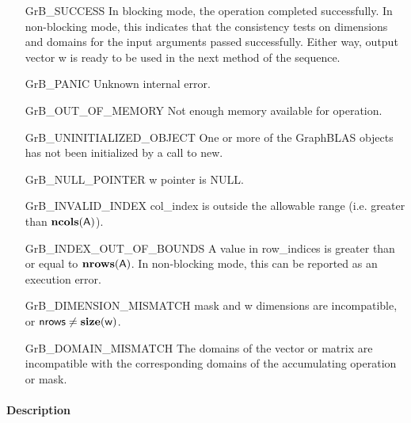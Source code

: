 \begin{itemize}[leftmargin=2.1in]
    \item[{\sf GrB\_SUCCESS}]         In blocking mode, the operation completed
    successfully. In non-blocking mode, this indicates that the consistency 
    tests on dimensions and domains for the input arguments passed successfully. 
    Either way, output vector {\sf w} is ready to be used in the next method of 
    the sequence.

    \item[{\sf GrB\_PANIC}]            Unknown internal error.
    
    \item[{\sf GrB\_OUT\_OF\_MEMORY}]  Not enough memory available for operation.
    
    \item[{\sf GrB\_UNINITIALIZED\_OBJECT}]  One or more of the GraphBLAS 
    objects has not been initialized by a call to {\sf new}.

    \item[{\sf GrB\_NULL\_POINTER}]    {\sf w} pointer is NULL.  
    
    \item[{\sf GrB\_INVALID\_INDEX}]    {\sf col\_index} is outside the allowable 
    range (i.e. greater than $\bold{ncols}({\sf A})$).

    \item[{\sf GrB\_INDEX\_OUT\_OF\_BOUNDS}]  A value in {\sf row\_indices} 
    is greater than or equal to $\bold{nrows}({\sf A})$.  In 
    non-blocking mode, this can be reported as an execution error.
    
    \item[{\sf GrB\_DIMENSION\_MISMATCH}] {\sf mask} and {\sf w} dimensions are
    incompatible, or ${\sf nrows} \neq \bold{size}({\sf w})$.

    \item[{\sf GrB\_DOMAIN\_MISMATCH}]     The domains of the vector or matrix
    are incompatible with the corresponding domains of the accumulating 
    operation or mask.
\end{itemize}

\paragraph{Description}

